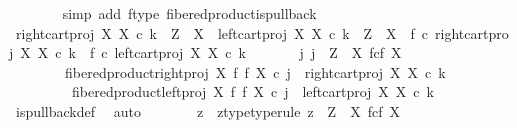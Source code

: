 \begin{isabellebody}
\ \ \ \ \ \ \isamarkupfalse%
\ {\isacharparenleft}{\kern0pt}simp\ add{\isacharcolon}{\kern0pt}\ f{\isacharunderscore}{\kern0pt}type\ fibered{\isacharunderscore}{\kern0pt}product{\isacharunderscore}{\kern0pt}is{\isacharunderscore}{\kern0pt}pullback{\isacharparenright}{\kern0pt}\isanewline
\ \ \ \ \isamarkupfalse%
\ \isamarkupfalse%
\ {\isachardoublequoteopen}right{\isacharunderscore}{\kern0pt}cart{\isacharunderscore}{\kern0pt}proj\ X\ X\ {\isasymcirc}\isactrlsub c\ k\ {\isacharcolon}{\kern0pt}\ Z\ {\isasymrightarrow}\ X\ {\isasymLongrightarrow}\ left{\isacharunderscore}{\kern0pt}cart{\isacharunderscore}{\kern0pt}proj\ X\ X\ {\isasymcirc}\isactrlsub c\ k\ {\isacharcolon}{\kern0pt}\ Z\ {\isasymrightarrow}\ X\ {\isasymLongrightarrow}\ f\ {\isasymcirc}\isactrlsub c\ right{\isacharunderscore}{\kern0pt}cart{\isacharunderscore}{\kern0pt}proj\ X\ X\ {\isasymcirc}\isactrlsub c\ k\ {\isacharequal}{\kern0pt}\ f\ {\isasymcirc}\isactrlsub c\ left{\isacharunderscore}{\kern0pt}cart{\isacharunderscore}{\kern0pt}proj\ X\ X\ {\isasymcirc}\isactrlsub c\ k\ {\isasymLongrightarrow}\isanewline
\ \ \ \ \ \ {\isacharparenleft}{\kern0pt}{\isasymexists}{\isacharbang}{\kern0pt}j{\isachardot}{\kern0pt}\ j\ {\isacharcolon}{\kern0pt}\ Z\ {\isasymrightarrow}\ X\ \isactrlbsub f\isactrlesub {\isasymtimes}\isactrlsub c\isactrlbsub f\isactrlesub \ X\ {\isasymand}\isanewline
\ \ \ \ \ \ \ \ fibered{\isacharunderscore}{\kern0pt}product{\isacharunderscore}{\kern0pt}right{\isacharunderscore}{\kern0pt}proj\ X\ f\ f\ X\ {\isasymcirc}\isactrlsub c\ j\ {\isacharequal}{\kern0pt}\ right{\isacharunderscore}{\kern0pt}cart{\isacharunderscore}{\kern0pt}proj\ X\ X\ {\isasymcirc}\isactrlsub c\ k\isanewline
\ \ \ \ \ \ \ \ {\isasymand}\ fibered{\isacharunderscore}{\kern0pt}product{\isacharunderscore}{\kern0pt}left{\isacharunderscore}{\kern0pt}proj\ X\ f\ f\ X\ {\isasymcirc}\isactrlsub c\ j\ {\isacharequal}{\kern0pt}\ left{\isacharunderscore}{\kern0pt}cart{\isacharunderscore}{\kern0pt}proj\ X\ X\ {\isasymcirc}\isactrlsub c\ k{\isacharparenright}{\kern0pt}{\isachardoublequoteclose}\isanewline
\ \ \ \ \ \ \isamarkupfalse%
\ is{\isacharunderscore}{\kern0pt}pullback{\isacharunderscore}{\kern0pt}def\ \isamarkupfalse%
\ auto\isanewline
\ \ \ \ \isamarkupfalse%
\ \isamarkupfalse%
\ z\ \ z{\isacharunderscore}{\kern0pt}type{\isacharbrackleft}{\kern0pt}type{\isacharunderscore}{\kern0pt}rule{\isacharbrackright}{\kern0pt}{\isacharcolon}{\kern0pt}\ {\isachardoublequoteopen}z\ {\isacharcolon}{\kern0pt}\ Z\ {\isasymrightarrow}\ X\ \isactrlbsub f\isactrlesub {\isasymtimes}\isactrlsub c\isactrlbsub f\isactrlesub \ X{\isachardoublequoteclose}\isanewline

\end{isabellebody}
